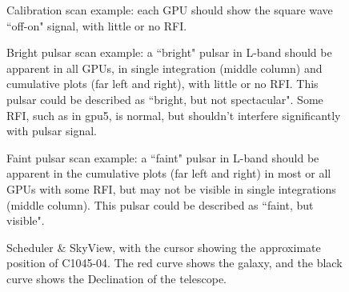\documentclass[11pt, reqno, tbtags]{article}
\begin{document}
\begin{figure}[h!]
 \centering
  \caption{Calibration scan example: each GPU should show the square wave ``off-on" signal, with little or no RFI.}
  \label{fig:cal}
\end{figure}
\vspace{1cm}

\begin{figure}[h!]
 \centering
  \caption{Bright pulsar scan example: a ``bright" pulsar in L-band should be apparent in all GPUs, in single integration (middle column) and cumulative plots (far left and right), with little or no RFI.  This pulsar could be described as ``bright, but not spectacular".  Some RFI, such as in gpu5, is normal, but shouldn't interfere significantly with pulsar signal.}
  \label{fig:bright}
\end{figure}


\begin{figure}[h!]
 \centering
  \caption{Faint pulsar scan example: a ``faint" pulsar in L-band should be apparent in the cumulative plots (far left and right) in most or all GPUs with some RFI, but may not be visible in single integrations (middle column).  This pulsar could be described as ``faint, but visible".}
  \label{fig:faint}
\end{figure}


\begin{figure}[h!]
 \centering
  \caption{Scheduler \& SkyView, with the cursor showing the approximate position of C1045-04.  The red curve shows the galaxy, and the black curve shows the Declination of the telescope.}
  \label{fig:ssv}
\end{figure}
\end{document}
